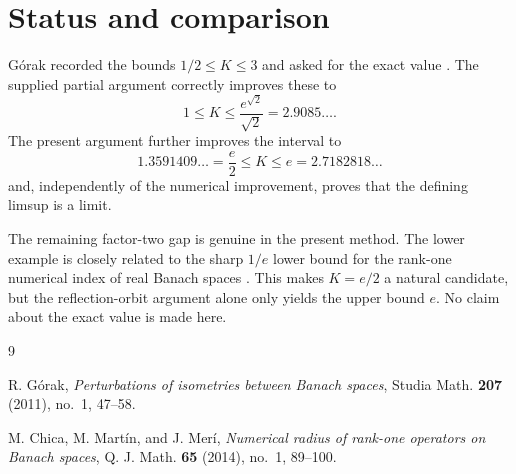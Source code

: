\documentclass[11pt]{article}
\theoremstyle{remark}
\begin{document}
\section{Status and comparison}

G\'orak recorded the bounds $1/2\le K\le3$ and asked for the exact value
\cite{Gorak}.  The supplied partial argument correctly improves these to
\[
 1\le K\le \frac{e^{\sqrt2}}{\sqrt2}=2.9085\ldots.
\]
The present argument further improves the interval to
\[
 1.3591409\ldots=\frac e2
 \le K\le
 e=2.7182818\ldots
\]
and, independently of the numerical improvement, proves that the defining
limsup is a limit.

The remaining factor-two gap is genuine in the present method.  The lower
example is closely related to the sharp $1/e$ lower bound for the rank-one
numerical index of real Banach spaces \cite{ChicaMartinMeri}.  This makes
$K=e/2$ a natural candidate, but the reflection-orbit argument alone only
yields the upper bound $e$.  No claim about the exact value is made here.

\begin{thebibliography}{9}

R. G\'orak,
\emph{Perturbations of isometries between Banach spaces},
Studia Math. \textbf{207} (2011), no.~1, 47--58.

M. Chica, M. Mart\'in, and J. Mer\'i,
\emph{Numerical radius of rank-one operators on Banach spaces},
Q. J. Math. \textbf{65} (2014), no.~1, 89--100.

\end{thebibliography}
\end{document}
